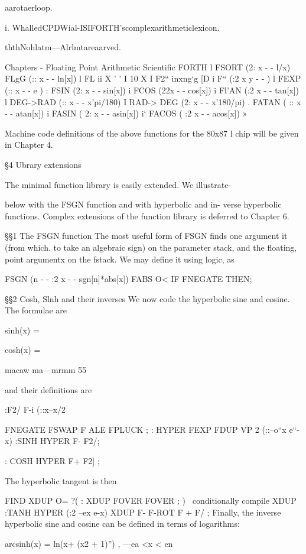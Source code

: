 aarotaerloop.

i. WhalledCPDWial-ISIFORTH'scomplexarithmeticlexicon.

ththNohlatm—Alrlmtareaarved.

 

Chapters - Floating Point Arithmetic Scientific FORTH
l
FSORT (2: x - - l/x)
FLgG (:: x - - ln[x]) l
FL ii X ' ' I 10 X I
F2“ inxng‘g [D i
F“ (:2 x y - - ) l
FEXP (:: x - - e ) :
FSIN (2: x - - sin[x]) i
FCOS (22x - - cos[x]) i
Fl'AN (:2 x - - tan[x]) l
DEG->RAD (:: x - - x’pi/180) I
RAD-> DEG (2: x - - x'180/pi) .
FATAN ( :: x - - atan[x]) i
FASIN ( 2: x - - asin[x]) i‘
FACOS ( :2 x - - acos[x]) »

Machine code deﬁnitions of the above functions for the 80x87 l
chip will be given in Chapter 4.

§4 Ubrary extensions

The minimal function library is easily extended. We illustrate-

below with the FSGN function and with hyperbolic and in-
verse hyperbolic functions. Complex extensions of the function
library is deferred to Chapter 6.

§§1 The FSGN function
The most useful form of FSGN ﬁnds one argument it (from which.
to take an algebraic sign) on the parameter stack, and the floating,
point argumentx on the fstack. We may deﬁne it using logic, as

FSGN (n - - :2 x - - sgn[n]*abs[x])
FABS O< IF FNEGATE THEN;

§§2 Cosh, Slnh and their inverses
We now code the hyperbolic sine and cosine. The formulae are

sinh(x) = %

cosh(x) = %

macaw ma—mrmm 55

and their deﬁnitions are

:F2/ F-i (::x--x/2

FNEGATE FSWAP F ALE FPLUCK ;
: HYPER FEXP FDUP VP 2 (::--o“x e“-x)
:SINH HYPER F- F2/;

: COSH HYPER F+ F2] ;

The hyperbolic tangent is then

FIND XDUP O= ?( : XDUP FOVER FOVER ; )
\ conditionally compile XDUP
:TANH HYPER (:2 --ex e-x)
XDUP F- F-ROT F + F/ ;
Finally, the inverse hyperbolic sine and cosine can be deﬁned in
terms of logarithms:

arcsinh(x) = ln(x+ (x2 + 1)”) , —ea <x < en

